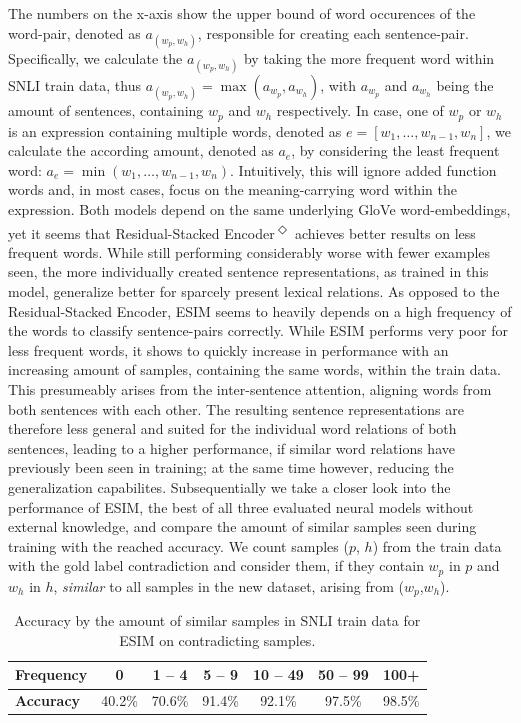 The numbers on the x-axis show the upper bound of word occurences of the word-pair, denoted as $a_{(w_p,w_h)}$, responsible for creating each sentence-pair. Specifically, we calculate the $a_{(w_p,w_h)}$ by taking the more frequent word within \ac{SNLI} train data, thus $a_{(w_p,w_h)} = \max(a_{w_p},a_{w_h})$, with $a_{w_p}$ and $a_{w_h}$ being the amount of sentences, containing $w_p$ and $w_h$ respectively. In case, one of $w_p$ or $w_h$ is an expression containing multiple words, denoted as $e = [w_1, \ldots , w_{n-1}, w_{n}]$, we calculate the according amount, denoted as $a_e$, by considering the least frequent word: $a_e = \min(w_1, \ldots , w_{n-1}, w_n)$. Intuitively, this will ignore added function words and, in most cases, focus on the meaning-carrying word within the expression. Both models depend on the same underlying GloVe word-embeddings, yet it seems that Residual-Stacked Encoder\textsuperscript{$\Diamond$} achieves better results on less frequent words.  While still performing considerably worse with fewer examples seen, the more individually created sentence representations, as trained in this model, generalize better for sparcely present lexical relations. As opposed to the Residual-Stacked Encoder, ESIM seems to heavily depends on a high frequency of the words to classify sentence-pairs correctly.  While ESIM performs very poor for less frequent words, it shows to quickly increase in performance with an increasing amount of samples, containing the same words, within the train data. This presumeably arises from the inter-sentence attention, aligning words from both sentences with each other. The resulting sentence representations are therefore less general and suited for the individual word relations of both sentences, leading to a higher performance, if similar word relations have previously been seen in training; at the same time however, reducing the generalization capabilites. Subsequentially we take a closer look into the performance of ESIM, the best of all three evaluated neural models without external knowledge, and compare the amount of similar samples seen during training with the reached accuracy. We count samples ($p$, $h$) from the train data with the gold label contradiction and consider them, if they contain $w_p$ in $p$ and $w_h$ in $h$, \textit{similar} to all samples in the new dataset, arising from ($w_p$,$w_h$). 
\begin{table}[tph!]
\centering
\begin{tabular}{l|c|c|c|c|c|c}
\toprule
\textbf{Frequency} & 0 & 1 -- 4 & 5 -- 9 & 10 -- 49 & 50 -- 99 & 100+ \\
\midrule
\textbf{Accuracy} & 40.2\% & 70.6\% & 91.4\% & 92.1\% & 97.5\% & 98.5\% \\
\bottomrule
\end{tabular}
\label{tab:esim_acc_by_sim_samples}
\caption{Accuracy by the amount of similar samples in \ac{SNLI} train data for ESIM on contradicting samples.}
\end{table}
